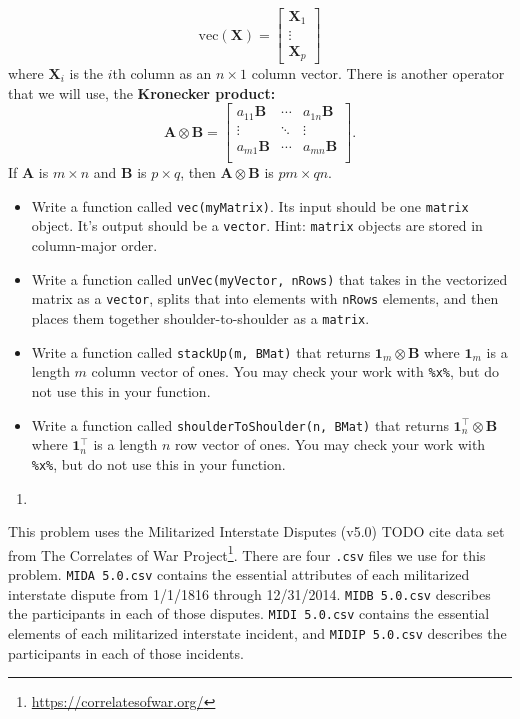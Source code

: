 \documentclass[
  12pt,
  krantz2]{krantz}
\providecommand{\tightlist}{%
  \setlength{\itemsep}{0pt}\setlength{\parskip}{0pt}}
\renewcommand{\href}[2]{#2\footnote{\url{#1}}}
\begin{document}
\[
\text{vec}(\mathbf{X}) =\begin{bmatrix} \mathbf{X}_1 \\ \vdots \\ \mathbf{X}_p \end{bmatrix} 
\]
where \(\mathbf{X}_i\) is the \(i\)th column as an \(n \times 1\) column vector. There is another operator that we will use, the \textbf{Kronecker product:}
\[
\mathbf{A} \otimes \mathbf{B} = 
\begin{bmatrix}
a_{11} \mathbf{B} & \cdots & a_{1n} \mathbf{B} \\
\vdots & \ddots & \vdots \\
a_{m1} \mathbf{B} & \cdots & a_{mn} \mathbf{B} \\
\end{bmatrix}.
\]
If \(\mathbf{A}\) is \(m \times n\) and \(\mathbf{B}\) is \(p \times q\), then \(\mathbf{A} \otimes \mathbf{B}\) is \(pm \times qn\).

\begin{itemize}
\tightlist
\item
  Write a function called \texttt{vec(myMatrix)}. Its input should be one \texttt{matrix} object. It's output should be a \texttt{vector}. Hint: \texttt{matrix} objects are stored in column-major order.
\item
  Write a function called \texttt{unVec(myVector,\ nRows)} that takes in the vectorized matrix as a \texttt{vector}, splits that into elements with \texttt{nRows} elements, and then places them together shoulder-to-shoulder as a \texttt{matrix}.
\item
  Write a function called \texttt{stackUp(m,\ BMat)} that returns \(\mathbf{1}_m \otimes \mathbf{B}\) where \(\mathbf{1}_m\) is a length \(m\) column vector of ones. You may check your work with \texttt{\%x\%}, but do not use this in your function.
\item
  Write a function called \texttt{shoulderToShoulder(n,\ BMat)} that returns \(\mathbf{1}^\intercal_n \otimes \mathbf{B}\) where \(\mathbf{1}_n^\intercal\) is a length \(n\) row vector of ones. You may check your work with \texttt{\%x\%}, but do not use this in your function.
\end{itemize}

\begin{enumerate}
\def\labelenumi{\arabic{enumi}.}
\setcounter{enumi}{3}
\tightlist
\item
\end{enumerate}

This problem uses the Militarized Interstate Disputes (v5.0) TODO cite data set from \href{https://correlatesofwar.org/}{The Correlates of War Project}. There are four \texttt{.csv} files we use for this problem. \texttt{MIDA\ 5.0.csv} contains the essential attributes of each militarized interstate dispute from 1/1/1816 through 12/31/2014. \texttt{MIDB\ 5.0.csv} describes the participants in each of those disputes. \texttt{MIDI\ 5.0.csv} contains the essential elements of each militarized interstate incident, and \texttt{MIDIP\ 5.0.csv} describes the participants in each of those incidents.
\end{document}
